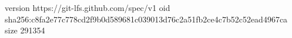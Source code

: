 version https://git-lfs.github.com/spec/v1
oid sha256:c8fa2e77c778cd2f9b0d589681c039013d76c2a51fb2ce4c7b52c52ead4967ca
size 291354
